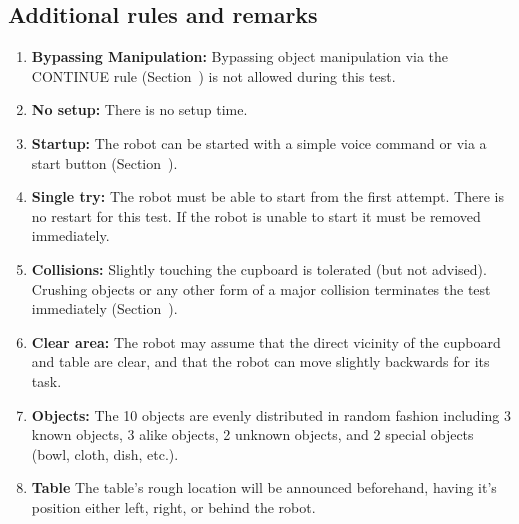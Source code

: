 \subsection{Additional rules and remarks}
\begin{enumerate}
	\item \textbf{Bypassing Manipulation:} Bypassing object manipulation via the CONTINUE rule (Section~) is not allowed during this test.
	\item \textbf{No setup:} There is no setup time.
	\item \textbf{Startup:} The robot can be started with a simple voice command or via a start button (Section~).
	\item \textbf{Single try:} The robot must be able to start from the first attempt. There is no restart for this test. If the robot is unable to start it must be removed immediately.
	\item \textbf{Collisions:} Slightly touching the cupboard is tolerated (but not advised). Crushing objects or any other form of a major collision terminates the test immediately (Section~).
	\item \textbf{Clear area:} The robot may assume that the direct vicinity of the cupboard and table are clear, and that the robot can move slightly backwards for its task.
	\item \textbf{Objects:} The 10 objects are evenly distributed in random fashion including
	3 known objects,
	3 alike objects,
	2 unknown objects, and
	2 special objects (bowl, cloth, dish, etc.).
	\item \textbf{Table} The table's rough location will be announced beforehand, having it's position either left, right, or behind the robot.
\end{enumerate}


